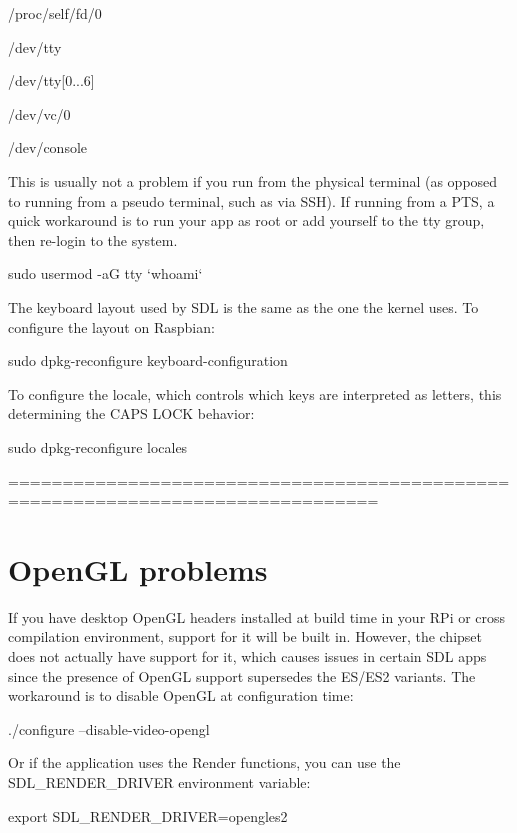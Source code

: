 \begin{DoxyItemize}
\item /proc/self/fd/0
\item /dev/tty
\item /dev/tty\mbox{[}0...6\mbox{]}
\item /dev/vc/0
\item /dev/console
\end{DoxyItemize}

This is usually not a problem if you run from the physical terminal (as opposed to running from a pseudo terminal, such as via S\+SH). If running from a P\+TS, a quick workaround is to run your app as root or add yourself to the tty group, then re-\/login to the system. \begin{DoxyVerb}sudo usermod -aG tty `whoami`
\end{DoxyVerb}


The keyboard layout used by S\+DL is the same as the one the kernel uses. To configure the layout on Raspbian\+: \begin{DoxyVerb}sudo dpkg-reconfigure keyboard-configuration
\end{DoxyVerb}


To configure the locale, which controls which keys are interpreted as letters, this determining the C\+A\+PS L\+O\+CK behavior\+: \begin{DoxyVerb}sudo dpkg-reconfigure locales
\end{DoxyVerb}


================================================================================ \section*{Open\+GL problems }

If you have desktop Open\+GL headers installed at build time in your R\+Pi or cross compilation environment, support for it will be built in. However, the chipset does not actually have support for it, which causes issues in certain S\+DL apps since the presence of Open\+GL support supersedes the E\+S/\+E\+S2 variants. The workaround is to disable Open\+GL at configuration time\+: \begin{DoxyVerb}./configure --disable-video-opengl
\end{DoxyVerb}


Or if the application uses the Render functions, you can use the S\+D\+L\+\_\+\+R\+E\+N\+D\+E\+R\+\_\+\+D\+R\+I\+V\+ER environment variable\+: \begin{DoxyVerb}export SDL_RENDER_DRIVER=opengles2
\end{DoxyVerb}


